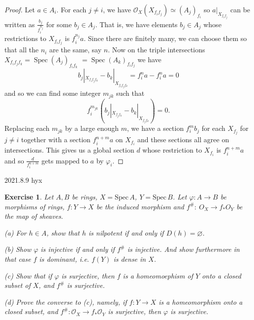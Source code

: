 \documentclass{amsart}
\newtheorem{exe}{Exercise}[subsection]
\theoremstyle{remark}\newtheorem{rmk}[theorem]{Remark}
\begin{document}
\begin{proof}
Let $a \in A_{i} .$ For each $j \neq i$, we have $\mathcal{O}_{X}\left(X_{f_{i} f_{j}}\right) \simeq\left(A_{j}\right)_{f_{i}}$ so $a|_{X_{f_{i} f_{j}}}$ can be written as $\frac{b_{j}}{f_{i}^{n_{j}}}$ for some $b_{j} \in A_{j} .$ That is, we have elements $b_{j} \in A_{j}$ whose restrictions to $X_{f_{i} f_{j}}$ is $f_{i}^{n_{j}} a$. Since there are finitely many, we can choose them so that all the $n_{i}$ are the same, say $n .$ Now on the triple intersections $X_{f_{i} f_{j} f_{k}}=\operatorname{Spec}\left(A_{j}\right)_{f_{i} f_{k}}$ $=\operatorname{Spec}\left(A_{k}\right)_{f_{i} f_{j}}$ we have $$b_{j}|_{X_{f_if_jf_k}}-b_{k}|_{X_{f_if_jf_k}}=f_{i}^{n} a-f_{i}^{n} a=0$$ and so we can find some integer $m_{j k}$ such that $$f_{i}^{m_{j k}}\left(b_{j}|_{X_{f_jf_k}}-b_{k}|_{X_{f_jf_k}}\right)=0.$$ Replacing each $m_{j k}$ by a large enough $m$, we have a section $f_{i}^{m} b_{j}$ for each $X_{f_{j}}$ for $j \neq i$ together with a section $f_{i}^{n+m} a$ on $X_{f_{i}}$ and these sections all agree on intersections. This gives us a global section $d$ whose restriction to $X_{f_{i}}$ is $f_{i}^{n+m} a$ and so $\frac{d}{f_{i}^{n+m}}$ gets mapped to $a$ by $\varphi_{i}$.
\end{proof}

2021.8.9 hyx 
\begin{exe}
	\label{2.2.18}
Let $A, B$ be rings, $X=\mathrm{Spec}\,A$, $Y=\mathrm{Spec}\,B$. Let $\varphi : A\rightarrow B$ be morphisms of rings, $f: Y\rightarrow X $
be the induced morphism and $f^\#:\ O_X \rightarrow f_*O_Y$ be the map of sheaves.

(a) For $h\in A$, show that $h$ is nilpotent if and only if $D(h)=\varnothing$.

(b) Show $\varphi$ is injective if and only if $f^\#$ is injective. And show furthermore in that case $f$ is \emph{dominant}, i.e. $f(Y)$ is dense in $X$.

(c) Show that if $\varphi$ is surjective, then $f$ is a homeomoephism of $Y$ onto a closed subset of $X$, and $f^\#$ is surjective.

(d) Prove the converse to (c), namely, if $f:Y\to X$ is a homeomorphism onto a closed subset, and $f^\#:\mathcal{O}_X\to f_*\mathcal{O}_Y$ is surjective, then $\varphi$ is surjective.
\end{exe}
\end{document}
